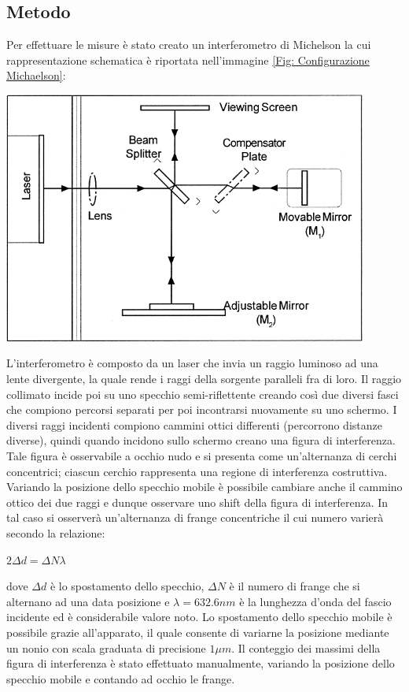 \documentclass[a4paper]{article}
\begin{document}
\subsection{Metodo}
Per effettuare le misure è stato creato un interferometro di Michelson la cui rappresentazione schematica è riportata nell'immagine \ref{Fig: Configurazione Michaelson}:
\begin{center}
	\includegraphics[width=0.9\textwidth]{./grafici/configurazione michaelson.png}
\label{Fig: Configurazione Michaelson}
\end{center}
L'interferometro è composto da un laser che invia un raggio luminoso ad una lente divergente, la quale rende i raggi della sorgente paralleli fra di loro. Il raggio collimato incide poi su uno specchio semi-riflettente creando così due diversi fasci che compiono percorsi separati per poi incontrarsi nuovamente su uno schermo. I diversi raggi incidenti compiono cammini ottici differenti (percorrono distanze diverse), quindi quando incidono sullo schermo creano una figura di interferenza. Tale figura è osservabile a occhio nudo e si presenta come un'alternanza di cerchi concentrici; ciascun cerchio rappresenta una regione di interferenza costruttiva. Variando la posizione dello specchio mobile è possibile cambiare anche il cammino ottico dei due raggi e dunque osservare uno shift della figura di interferenza. In tal caso si osserverà un'alternanza di frange concentriche il cui numero varierà secondo la relazione: 
\begin{center}
    $2 \Delta d=\Delta N \lambda $
\end{center}
dove $\Delta d$ è lo spostamento dello specchio, $\Delta N$ è il numero di frange che si alternano ad una data posizione e $\lambda=632.6 nm$ è la lunghezza d'onda del fascio incidente ed è considerabile valore noto. Lo spostamento dello specchio mobile è possibile grazie all'apparato, il quale consente di variarne la posizione mediante un nonio con scala graduata di precisione $1 \mu m$. Il conteggio dei massimi della figura di interferenza è stato effettuato manualmente, variando la posizione dello specchio mobile e contando ad occhio le frange.
\end{document}
